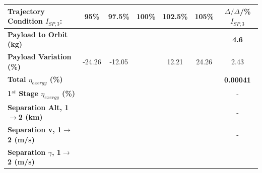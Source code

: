 \begin{table}[ht]
	\centering
	\begin{tabular}{l c c c c c c} 
		\hline \textbf{Trajectory Condition}   \qquad  $I_{SP,3}$:
		&95\%
		&97.5\%
		&100\%
		&102.5\%
		&105\%
		& $\Delta/\Delta$/\%$I_{SP,3}$
		\\
		\hline \textbf{Payload to Orbit (kg)}
		& \textbf{\PayloadToOrbitTThreeNinetyNoReturn}
		& \textbf{\PayloadToOrbitTThreeNinetyFiveNoReturn}
		& \textbf{\PayloadToOrbitTThreeStandardNoReturn}
		& \textbf{\PayloadToOrbitTThreeOneHundredFiveNoReturn}
		& \textbf{\PayloadToOrbitTThreeOneHundredTenNoReturn}
		&\textbf{4.6}
		\\
		\textbf{Payload Variation (\%)}
		& -24.26
		& -12.05
		& \PayloadVarTThreeStandardNoReturn
		& 12.21
		& 24.26
		&2.43
		\\
		\textbf{Total $\eta_{exergy}$ (\%)}
		& \textbf{\totalExergyEffTThreeNinetyNoReturn}
		& \textbf{\totalExergyEffTThreeNinetyFiveNoReturn}
		& \textbf{\totalExergyEffTThreeStandardNoReturn}
		& \textbf{\totalExergyEffTThreeOneHundredFiveNoReturn}
		& \textbf{\totalExergyEffTThreeOneHundredTenNoReturn}
		& \textbf{0.00041}
		\\
		\hline 
		\textbf{1$^{st}$ Stage $\eta_{exergy}$ (\%)}
		& \textbf{\firstExergyEffTThreeNinetyNoReturn}
		& \textbf{\firstExergyEffTThreeNinetyFiveNoReturn}
		& \textbf{\firstExergyEffTThreeStandardNoReturn}
		& \textbf{\firstExergyEffTThreeOneHundredFiveNoReturn}
		& \textbf{\firstExergyEffTThreeOneHundredTenNoReturn}
		& -
		\\
		\textbf{Separation Alt, 1$\rightarrow$2 (km)}
		& \firstsecondSeparationAltTThreeNinetyNoReturn
		& \firstsecondSeparationAltTThreeNinetyFiveNoReturn
		& \firstsecondSeparationAltTThreeStandardNoReturn
		& \firstsecondSeparationAltTThreeOneHundredFiveNoReturn
		& \firstsecondSeparationAltTThreeOneHundredTenNoReturn
		& -
		\\
		\textbf{Separation v, 1$\rightarrow$2 (m/s)}
		& \firstsecondSeparationvTThreeNinetyNoReturn
		& \firstsecondSeparationvTThreeNinetyFiveNoReturn
		& \firstsecondSeparationvTThreeStandardNoReturn
		& \firstsecondSeparationvTThreeOneHundredFiveNoReturn
		& \firstsecondSeparationvTThreeOneHundredTenNoReturn
		& -
		\\
		\textbf{Separation $\gamma$, 1$\rightarrow$2 (m/s)}
		& \firstsecondSeparationgammaTThreeNinetyNoReturn
		& \firstsecondSeparationgammaTThreeNinetyFiveNoReturn
		& \firstsecondSeparationgammaTThreeStandardNoReturn

\end{tabular}
\end{table}
